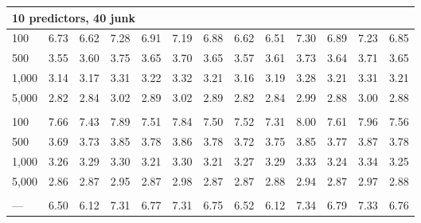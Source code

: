 \documentclass[AMA,STIX1COL,doublespace]{WileyNJD-v2}
\begin{document}
\begin{table}
\begin{tabular}[t]{lcccccccccccc}
\multicolumn{13}{l}{\textbf{10 predictors, 40 junk}}\\
\hline
\hspace{1em}100 & 6.73 & 6.62 & 7.28 & 6.91 & 7.19 & 6.88 & 6.62 & 6.51 & 7.30 & 6.89 & 7.23 & 6.85\\
\hspace{1em}500 & 3.55 & 3.60 & 3.75 & 3.65 & 3.70 & 3.65 & 3.57 & 3.61 & 3.73 & 3.64 & 3.71 & 3.65\\
\hspace{1em}1,000 & 3.14 & 3.17 & 3.31 & 3.22 & 3.32 & 3.21 & 3.16 & 3.19 & 3.28 & 3.21 & 3.31 & 3.21\\
\hspace{1em}5,000 & 2.82 & 2.84 & 3.02 & 2.89 & 3.02 & 2.89 & 2.82 & 2.84 & 2.99 & 2.88 & 3.00 & 2.88\\
\addlinespace[0.75em]
\multicolumn{13}{l}{\textbf{10 predictors, 490 junk}}\\
\hline
\hspace{1em}100 & 7.66 & 7.43 & 7.89 & 7.51 & 7.84 & 7.50 & 7.52 & 7.31 & 8.00 & 7.61 & 7.96 & 7.56\\
\hspace{1em}500 & 3.69 & 3.73 & 3.85 & 3.78 & 3.86 & 3.78 & 3.72 & 3.75 & 3.85 & 3.77 & 3.87 & 3.78\\
\hspace{1em}1,000 & 3.26 & 3.29 & 3.30 & 3.21 & 3.30 & 3.21 & 3.27 & 3.29 & 3.33 & 3.24 & 3.34 & 3.25\\
\hspace{1em}5,000 & 2.86 & 2.87 & 2.95 & 2.87 & 2.98 & 2.87 & 2.87 & 2.88 & 2.94 & 2.87 & 2.97 & 2.88\\
\addlinespace[0.75em]
\multicolumn{13}{l}{\textbf{Overall}}\\
\hline
\hspace{1em}--- & 6.50 & 6.12 & 7.31 & 6.77 & 7.31 & 6.75 & 6.52 & 6.12 & 7.34 & 6.79 & 7.33 & 6.76\\
\bottomrule
\end{tabular}
\end{table}
\end{document}
